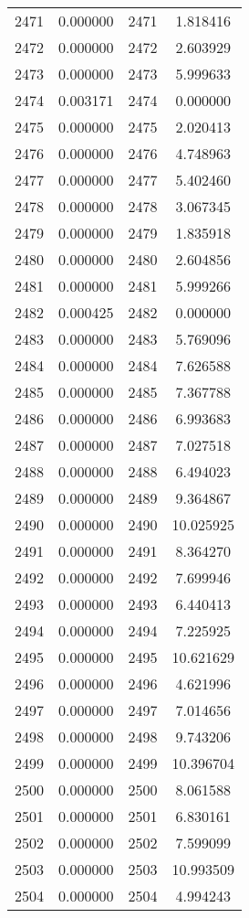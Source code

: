\documentclass[12pt]{article}
\begin{document}
\begin{longtable}{@{}cccc@{}}
2471 & 0.000000 & 2471 & 1.818416 \\
2472 & 0.000000 & 2472 & 2.603929 \\
2473 & 0.000000 & 2473 & 5.999633 \\
2474 & 0.003171 & 2474 & 0.000000 \\
2475 & 0.000000 & 2475 & 2.020413 \\
2476 & 0.000000 & 2476 & 4.748963 \\
2477 & 0.000000 & 2477 & 5.402460 \\
2478 & 0.000000 & 2478 & 3.067345 \\
2479 & 0.000000 & 2479 & 1.835918 \\
2480 & 0.000000 & 2480 & 2.604856 \\
2481 & 0.000000 & 2481 & 5.999266 \\
2482 & 0.000425 & 2482 & 0.000000 \\
2483 & 0.000000 & 2483 & 5.769096 \\
2484 & 0.000000 & 2484 & 7.626588 \\
2485 & 0.000000 & 2485 & 7.367788 \\
2486 & 0.000000 & 2486 & 6.993683 \\
2487 & 0.000000 & 2487 & 7.027518 \\
2488 & 0.000000 & 2488 & 6.494023 \\
2489 & 0.000000 & 2489 & 9.364867 \\
2490 & 0.000000 & 2490 & 10.025925 \\
2491 & 0.000000 & 2491 & 8.364270 \\
2492 & 0.000000 & 2492 & 7.699946 \\
2493 & 0.000000 & 2493 & 6.440413 \\
2494 & 0.000000 & 2494 & 7.225925 \\
2495 & 0.000000 & 2495 & 10.621629 \\
2496 & 0.000000 & 2496 & 4.621996 \\
2497 & 0.000000 & 2497 & 7.014656 \\
2498 & 0.000000 & 2498 & 9.743206 \\
2499 & 0.000000 & 2499 & 10.396704 \\
2500 & 0.000000 & 2500 & 8.061588 \\
2501 & 0.000000 & 2501 & 6.830161 \\
2502 & 0.000000 & 2502 & 7.599099 \\
2503 & 0.000000 & 2503 & 10.993509 \\
2504 & 0.000000 & 2504 & 4.994243 \\

\end{longtable}
\end{document}
